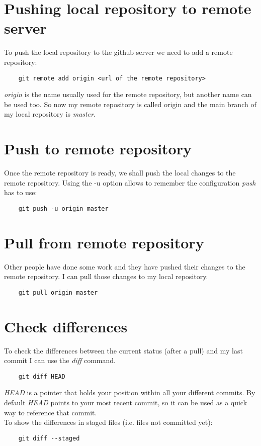 \documentclass[10pt,letterpaper]{book}
\begin{document}
\section{Pushing local repository to remote server}
To push the local repository to the github server we need to add a remote repository:
\begin{lstlisting}
	git remote add origin <url of the remote repository>
\end{lstlisting}

\textit{origin} is the name usually used for the remote repository, but another name can be used too.
So now my remote repository is called origin and the main branch of my local repository is \textit{master}.

\section{Push to remote repository}
Once the remote repository is ready, we shall push the local changes to the remote repository. Using the -u option allows to remember the configuration \textit{push} has to use:
\begin{lstlisting}
	git push -u origin master
\end{lstlisting}

\section{Pull from remote repository}
Other people have done some work and they have pushed their changes to the remote repository. I can pull those changes to my local repository.
\begin{lstlisting}
	git pull origin master
\end{lstlisting}

\section{Check differences}
To check the differences between the current status (after a pull) and my last commit I can use the \textit{diff} command.
\begin{lstlisting}
	git diff HEAD
\end{lstlisting}

\textit{HEAD} is a pointer that holds your position within all your different commits. By default \textit{HEAD} points to your most recent commit, so it can be used as a quick way to reference that commit.\\
To show the differences in staged files (i.e. files not committed yet):
\begin{lstlisting}
	git diff --staged
\end{lstlisting}
\end{document}
